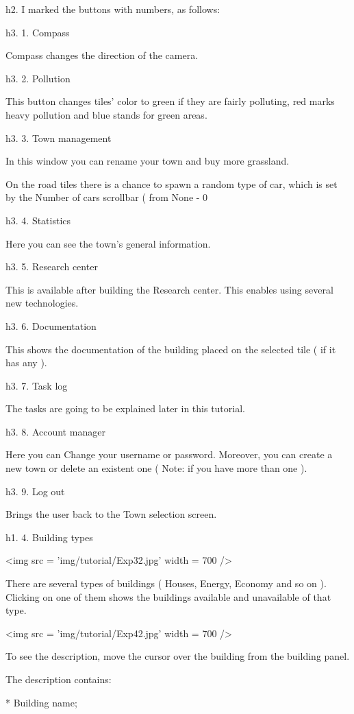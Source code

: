 h2. I marked the buttons with numbers, as follows:

h3. 1. Compass

Compass changes the direction of the camera.

h3. 2. Pollution

This button changes tiles' color to green if they are fairly polluting, red marks heavy pollution and blue stands for green areas.

h3. 3. Town management

In this window you can rename your town and buy more grassland.

On the road tiles there is a chance to spawn a random type of car, which is set by the Number of cars scrollbar ( from None - 0%

h3. 4. Statistics

Here you can see the town's general information.

h3. 5. Research center

This is available after building the Research center. This enables using several new technologies.

h3. 6. Documentation

This shows the documentation of the building placed on the selected tile ( if it has any ).

h3. 7. Task log

The tasks are going to be explained later in this tutorial.

h3. 8. Account manager

Here you can Change your username or password. Moreover, you can create a new town or delete an existent one ( Note: if you have more than one ).

h3. 9. Log out

Brings the user back to the Town selection screen.

h1. 4. Building types

<img src = 'img/tutorial/Exp32.jpg' width = 700 />

There are several types of buildings ( Houses, Energy, Economy and so on ). Clicking on one of them shows the buildings available and unavailable of that type.

<img src = 'img/tutorial/Exp42.jpg' width = 700 />

To see the description, move the cursor over the building from the building panel.

The description contains: 

* Building name;


